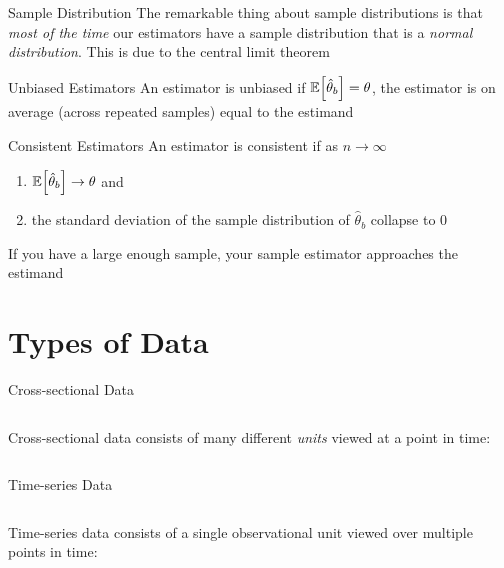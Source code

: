 \documentclass[aspectratio=169,t,11pt,table]{beamer}
\begin{document}
\begin{frame}{Sample Distribution}
  The remarkable thing about sample distributions is that \emph{most of the time} our estimators have a sample distribution that is a \emph{normal distribution}. This is due to the \alert{central limit theorem}
\end{frame}

\begin{frame}{Unbiased Estimators}
  An estimator is \alert{unbiased} if $\expec{\hat{\theta}_b} = \theta$, the estimator is on average (across repeated samples) equal to the estimand
\end{frame}

\begin{frame}{Consistent Estimators}
  An estimator is \alert{consistent} if as $n \to \infty$
  \begin{enumerate}
    \item $\expec{\hat{\theta}_b} \to \theta$ and
    \item the standard deviation of the sample distribution of $\hat{\theta}_b$ collapse to $0$
  \end{enumerate} 

  \bigskip
  If you have a large enough sample, your sample estimator approaches the estimand
\end{frame}



\section{Types of Data}

\begin{frame}{Cross-sectional Data}
  \begin{columns}[T]
    \begin{column}{.4\textwidth}
      \alert{Cross-sectional data} consists of many different \emph{units} viewed at a point in time:
    \end{column}
    \begin{column}{.6\textwidth}
      \vspace*{-\bigskipamount}
      
    \end{column}
  \end{columns}
\end{frame}

\begin{frame}{Time-series Data}
  \begin{columns}[T]
    \begin{column}{.4\textwidth}
      \alert{Time-series data} consists of a single observational unit viewed over multiple points in time:
    \end{column}
    \begin{column}{.6\textwidth}
      \vspace*{-\bigskipamount}
      
    \end{column}
  \end{columns}
\end{frame}
\end{document}
